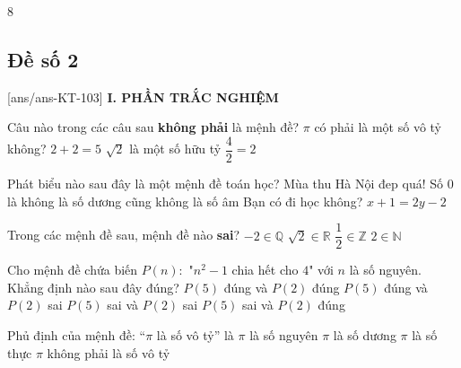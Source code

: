 \begin{indapan}{8}
\subsection*{Đề số 2}
\setcounter{ex}{0}\setcounter{bt}{0}
[ans/ans-KT-103]
\noindent\textbf{I. PHẦN TRẮC NGHIỆM}
\begin{ex}%
	Câu nào trong các câu sau \textbf{không phải} là mệnh đề?
	\choice
	{\True $\pi$ có phải là một số vô tỷ không?}
	{$2+2=5$}
	{$\sqrt{2}$ là một số hữu tỷ}
	{$\dfrac{4}{2}=2$}
\end{ex}
\begin{ex}%
	Phát biểu nào sau đây là một mệnh đề toán học?
	\choice
	{Mùa thu Hà Nội đep quá!}
	{\True Số 0 là không là số dương cũng không là số âm}
	{Bạn có đi học không?}
	{$x+1=2y-2$}
\end{ex}
\begin{ex}%
	Trong các mệnh đề sau, mệnh đề nào \textbf{sai}?
	\choice
	{$-2 \in \mathbb{Q}$}
	{$\sqrt{2} \in \mathbb{R}$}
	{\True $\dfrac{1}{2} \in \mathbb{Z}$}
	{$2 \in \mathbb{N}$}
\end{ex}
\begin{ex}%
	Cho mệnh đề chứa biến $P(n) \colon$ "$n^2-1$ chia hết cho $4$" với $n$ là số nguyên. Khẳng định nào sau đây đúng?
	\choice
	{$P(5)$ đúng và $P(2)$ đúng}
	{\True $P(5)$ đúng và $P(2)$ sai}
	{$P(5)$ sai và $P(2)$ sai}
	{$P(5)$ sai và $P(2)$ đúng}
\end{ex}
\begin{ex}%
	Phủ định của mệnh đề: ``$\pi$ là số vô tỷ'' là
	\choice
	{$\pi$ là số nguyên}
	{$\pi$ là số dương}
	{$\pi$ là số thực}
	{\True $\pi$ không phải là số vô tỷ}	

\end{ex}
\end{indapan}

